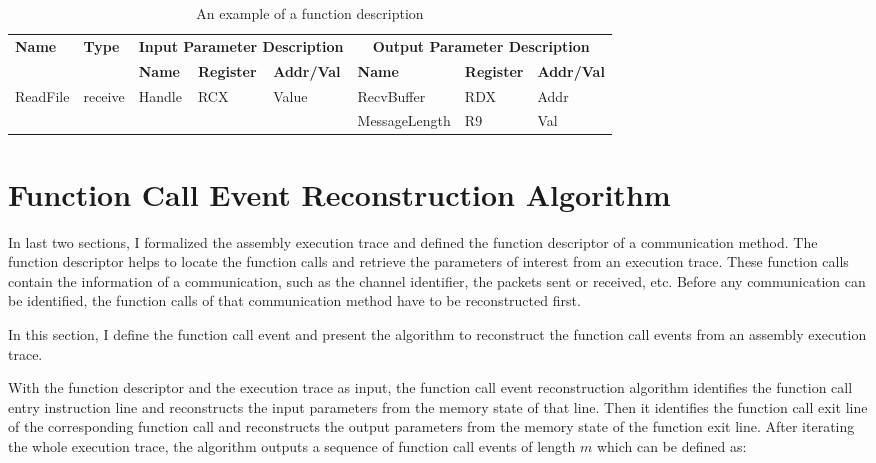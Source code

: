 \begin{table}[H]
        \centering
        \caption{An example of a function description}
        \label{functionexample}
        \begin{tabular}{|l|l|l|l|l|l|l|l|}
            \hline
             \multirow{2}{*}{{\textbf{Name}}} & \multirow{2}{*}{{\textbf{Type}}} & \multicolumn{3}{c|}{\textbf{Input Parameter Description}} & \multicolumn{3}{c|}{\textbf{Output Parameter Description}} \\
              \cline{3-8} 
             & & \textbf{Name}& \textbf{Register} &  \textbf{Addr/Val} & \textbf{Name}& \textbf{Register} &  \textbf{Addr/Val}  \\
             \hline
             \multirow{2}{*}{ReadFile}
             &\multirow{2}{*}{receive} &  \multirow{2}{*}{Handle} & \multirow{2}{*}{RCX} & \multirow{2}{*}{Value} & RecvBuffer & RDX  & Addr\\
              \cline{6-8} 
             & & & & & MessageLength & R9  & Val\\
            \hline            
        \end{tabular}
    \end{table}

\section{Function Call Event Reconstruction Algorithm}
In last two sections, I formalized the assembly execution trace and defined the function descriptor of a communication method. The function descriptor helps to locate the function calls and retrieve the parameters of interest from an execution trace. These function calls contain the information of a communication, such as the channel identifier, the packets sent or received, etc. Before any communication can be identified, the function calls of that communication method have to be reconstructed first. 

In this section, I define the function call event and present the algorithm to reconstruct the function call events from an assembly execution trace. 

With the function descriptor and the execution trace as input, the function call event reconstruction algorithm identifies the function call entry instruction line and reconstructs the input parameters from the memory state of that line. Then it identifies the function call exit line of the corresponding function call and reconstructs the output parameters from the memory state of the function exit line. After iterating the whole execution trace, the algorithm outputs a sequence of function call events of length $m$ which can be defined as:

